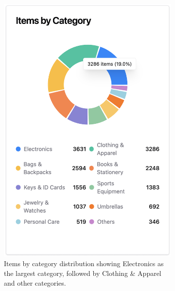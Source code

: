\begin{figure}[h]
    \centering
    \begin{subfigure}[b]{0.32\textwidth}
        \centering
        \includegraphics[width=\textwidth]{figs/appendix/web/2A.png}
        \caption{Items by category distribution showing Electronics as the largest category, followed by Clothing \& Apparel and other categories.}
        \label{fig:web_items_category}
    \end{subfigure}
    \hfill
    \begin{subfigure}[b]{0.32\textwidth}
        \centering

\end{subfigure}
\end{figure}
